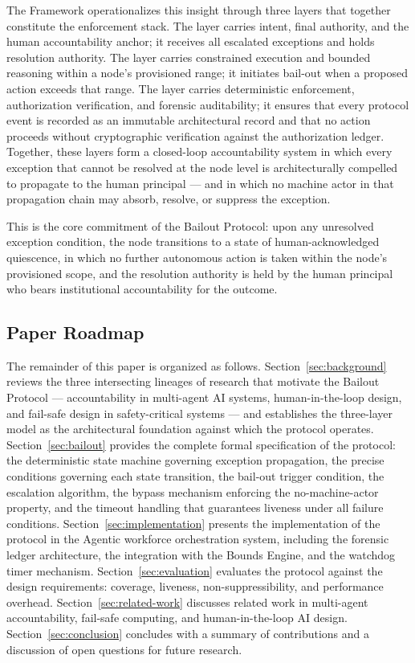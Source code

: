 The \bxthree{} Framework operationalizes this insight through three layers that together constitute the enforcement stack. The \purpose{} layer carries intent, final authority, and the human accountability anchor; it receives all escalated exceptions and holds resolution authority. The \bounds{} layer carries constrained execution and bounded reasoning within a node's provisioned range; it initiates bail-out when a proposed action exceeds that range. The \fact{} layer carries deterministic enforcement, authorization verification, and forensic auditability; it ensures that every protocol event is recorded as an immutable architectural record and that no action proceeds without cryptographic verification against the authorization ledger. Together, these layers form a closed-loop accountability system in which every exception that cannot be resolved at the node level is architecturally compelled to propagate to the human principal — and in which no machine actor in that propagation chain may absorb, resolve, or suppress the exception.

This is the core commitment of the Bailout Protocol: upon any unresolved exception condition, the node transitions to a state of human-acknowledged quiescence, in which no further autonomous action is taken within the node's provisioned scope, and the resolution authority is held by the human principal who bears institutional accountability for the outcome.

\subsection{Paper Roadmap}\label{sec:roadmap}

The remainder of this paper is organized as follows. Section~\ref{sec:background} reviews the three intersecting lineages of research that motivate the Bailout Protocol — accountability in multi-agent AI systems, human-in-the-loop design, and fail-safe design in safety-critical systems — and establishes the \bxthree{} three-layer model as the architectural foundation against which the protocol operates. Section~\ref{sec:bailout} provides the complete formal specification of the protocol: the deterministic state machine governing exception propagation, the precise conditions governing each state transition, the bail-out trigger condition, the escalation algorithm, the bypass mechanism enforcing the no-machine-actor property, and the timeout handling that guarantees liveness under all failure conditions. Section~\ref{sec:implementation} presents the implementation of the protocol in the Agentic workforce orchestration system, including the forensic ledger architecture, the integration with the Bounds Engine, and the watchdog timer mechanism. Section~\ref{sec:evaluation} evaluates the protocol against the design requirements: coverage, liveness, non-suppressibility, and performance overhead. Section~\ref{sec:related-work} discusses related work in multi-agent accountability, fail-safe computing, and human-in-the-loop AI design. Section~\ref{sec:conclusion} concludes with a summary of contributions and a discussion of open questions for future research.